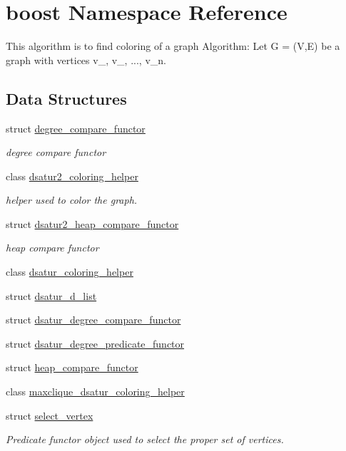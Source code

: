 \hypertarget{namespaceboost}{}\section{boost Namespace Reference}
\label{namespaceboost}


This algorithm is to find coloring of a graph Algorithm\+: Let G = (V,E) be a graph with vertices v\+\_, v\+\_, ..., v\+\_\+n.  


\subsection*{Data Structures}
\begin{DoxyCompactItemize}
\item 
struct \hyperlink{structboost_1_1degree__compare__functor}{degree\+\_\+compare\+\_\+functor}
\begin{DoxyCompactList}\small\item\em degree compare functor \end{DoxyCompactList}\item 
class \hyperlink{classboost_1_1dsatur2__coloring__helper}{dsatur2\+\_\+coloring\+\_\+helper}
\begin{DoxyCompactList}\small\item\em helper used to color the graph. \end{DoxyCompactList}\item 
struct \hyperlink{structboost_1_1dsatur2__heap__compare__functor}{dsatur2\+\_\+heap\+\_\+compare\+\_\+functor}
\begin{DoxyCompactList}\small\item\em heap compare functor \end{DoxyCompactList}\item 
class \hyperlink{classboost_1_1dsatur__coloring__helper}{dsatur\+\_\+coloring\+\_\+helper}
\item 
struct \hyperlink{structboost_1_1dsatur__d__list}{dsatur\+\_\+d\+\_\+list}
\item 
struct \hyperlink{structboost_1_1dsatur__degree__compare__functor}{dsatur\+\_\+degree\+\_\+compare\+\_\+functor}
\item 
struct \hyperlink{structboost_1_1dsatur__degree__predicate__functor}{dsatur\+\_\+degree\+\_\+predicate\+\_\+functor}
\item 
struct \hyperlink{structboost_1_1heap__compare__functor}{heap\+\_\+compare\+\_\+functor}
\item 
class \hyperlink{classboost_1_1maxclique__dsatur__coloring__helper}{maxclique\+\_\+dsatur\+\_\+coloring\+\_\+helper}
\item 
struct \hyperlink{structboost_1_1select__vertex}{select\+\_\+vertex}
\begin{DoxyCompactList}\small\item\em Predicate functor object used to select the proper set of vertices. \end{DoxyCompactList}\end{DoxyCompactItemize}
